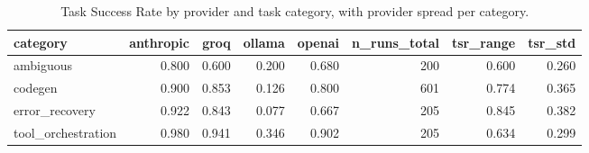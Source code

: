 \begin{table}
\caption{Task Success Rate by provider and task category, with provider spread per category.}
\label{tab:table5_tsr_by_category}
\begin{tabular}{lrrrrrrr}
\toprule
category & anthropic & groq & ollama & openai & n_runs_total & tsr_range & tsr_std \\
\midrule
ambiguous & 0.800 & 0.600 & 0.200 & 0.680 & 200 & 0.600 & 0.260 \\
codegen & 0.900 & 0.853 & 0.126 & 0.800 & 601 & 0.774 & 0.365 \\
error_recovery & 0.922 & 0.843 & 0.077 & 0.667 & 205 & 0.845 & 0.382 \\
tool_orchestration & 0.980 & 0.941 & 0.346 & 0.902 & 205 & 0.634 & 0.299 \\
\bottomrule
\end{tabular}
\end{table}
